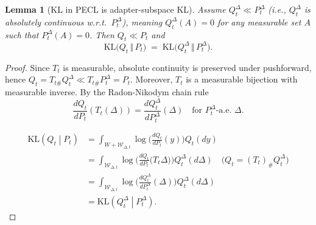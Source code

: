 \documentclass[10pt]{article} %
\newtheorem{lemma}{Lemma}
\begin{document}

\begin{lemma}[KL in PECL is adapter-subspace KL]
Assume $Q_t^\Delta \ll P_t^\Delta$ (i.e., $Q_t^\Delta$ is absolutely continuous w.r.t.\ $P_t^\Delta$), meaning $Q_t^\Delta(A)=0$ for any measurable set $A$ such that $P_t^\Delta(A)=0$.
Then $Q_t \ll P_t$ and
$$
\mathrm{KL}\bigl(Q_t\,\Vert\, P_t\bigr)
\;=\;
\mathrm{KL}\bigl(Q_t^\Delta \,\Vert\, P_t^\Delta\bigr).
$$
\end{lemma}

\begin{proof}
  Since $T_t$ is measurable, absolute continuity is preserved under pushforward, hence
$Q_t=T_{t\#}Q_t^\Delta \ll T_{t\#}P_t^\Delta=P_t$.
Moreover, $T_t$ is a measurable bijection with measurable inverse. 
  By the Radon-Nikodym chain rule
 \[
 \frac{dQ_t}{dP_t}(T_t(\Delta))=\frac{dQ_t^{\Delta}}{dP_t^{\Delta}}(\Delta)\quad\text{for }P^{\Delta}_t\text{-a.e.\ }\Delta.
 \]

\begin{equation*}
     \begin{aligned}
 \mathrm{KL}\left(Q_t\middle|P_t\right)
 &= \int_{W+\mathcal W_{\Delta,t}}
 \log\Big(\frac{dQ_t}{dP_t}(y)\Big)
 Q_t(dy)\\
 &= \int_{\mathcal W_{\Delta,t}}
 \log\Big(\frac{dQ_t}{dP_t}\big(T_t\Delta\big)\Big)
 Q_t^{\Delta}(d\Delta) \quad \text{(} Q_t=(T_t)_{\text{\#}}Q_t^{\Delta}\text{)} 
 \\
 &= \int_{\mathcal W_{\Delta,t}}
 \log\Big(\frac{dQ_t^{\Delta}}{dP_t^{\Delta}}(\Delta)\Big)
 Q_t^{\Delta}(d\Delta) \\
 &= \mathrm{KL}\left(Q_t^{\Delta}\middle|P_t^{\Delta}\right).
 \end{aligned}
\end{equation*} 
\end{proof}
\end{document}
